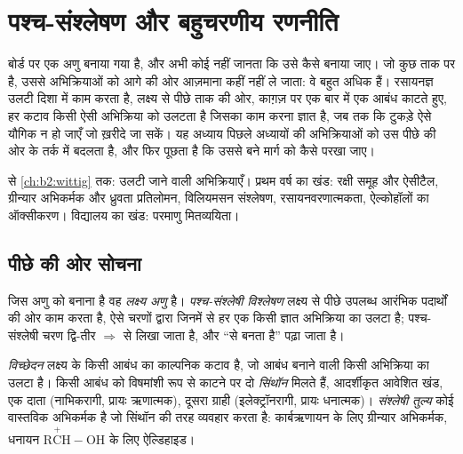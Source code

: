 \chapter{पश्च-संश्लेषण और बहुचरणीय रणनीति}\label{ch:b2:retrosynthesis}

बोर्ड पर एक अणु बनाया गया है, और अभी कोई नहीं जानता कि उसे कैसे बनाया जाए। जो कुछ ताक पर है, उससे
अभिक्रियाओं को आगे की ओर आज़माना कहीं नहीं ले जाता: वे बहुत अधिक हैं। रसायनज्ञ उलटी दिशा में काम करता है,
लक्ष्य से पीछे ताक की ओर, काग़ज़ पर एक बार में एक आबंध काटते हुए, हर कटाव किसी ऐसी अभिक्रिया को उलटता है
जिसका काम करना ज्ञात है, जब तक कि टुकड़े ऐसे यौगिक न हो जाएँ जो ख़रीदे जा सकें। यह अध्याय
पिछले अध्यायों की अभिक्रियाओं को उस पीछे की ओर के तर्क में बदलता है, और फिर पूछता है कि उससे बने मार्ग को कैसे परखा जाए।

\begin{recall}
 से \cref{ch:b2:wittig} तक: उलटी जाने वाली अभिक्रियाएँ। प्रथम वर्ष का खंड:
रक्षी समूह और ऐसीटैल, ग्रीन्यार अभिकर्मक और ध्रुवता प्रतिलोमन, विलियमसन संश्लेषण,
रसायनवरणात्मकता, ऐल्कोहॉलों का ऑक्सीकरण। विद्यालय का खंड: परमाणु मितव्ययिता।
\end{recall}

\section{पीछे की ओर सोचना}

\begin{definition}[पश्च-संश्लेषी विश्लेषण]\label{def:b2:retrosynthesis:analysis}
जिस अणु को बनाना है वह \emph{लक्ष्य अणु} है। \emph{पश्च-संश्लेषी विश्लेषण}
 लक्ष्य से पीछे उपलब्ध आरंभिक पदार्थों की ओर काम करता है,
ऐसे चरणों द्वारा जिनमें से हर एक किसी ज्ञात अभिक्रिया का उलटा है; पश्च-संश्लेषी चरण
द्वि-तीर $\Rightarrow$ से लिखा जाता है, और ``से बनता है'' पढ़ा जाता है।
\end{definition}

\begin{definition}[विच्छेदन और सिंथॉन]\label{def:b2:retrosynthesis:disconnection}
\emph{विच्छेदन} लक्ष्य के किसी आबंध का काल्पनिक कटाव है, जो आबंध बनाने वाली किसी अभिक्रिया का
उलटा है। किसी आबंध को विषमांशी रूप से काटने पर दो \emph{सिंथॉन} मिलते हैं,
आदर्शीकृत आवेशित खंड, एक दाता (नाभिकरागी, प्रायः ऋणात्मक), दूसरा ग्राही
(इलेक्ट्रॉनरागी, प्रायः धनात्मक)। \emph{संश्लेषी तुल्य} कोई वास्तविक
अभिकर्मक है जो सिंथॉन की तरह व्यवहार करता है: कार्बऋणायन  के लिए ग्रीन्यार अभिकर्मक,
धनायन $\mathrm{R\overset{+}{C}H{-}OH}$ के लिए ऐल्डिहाइड।
\end{definition}

